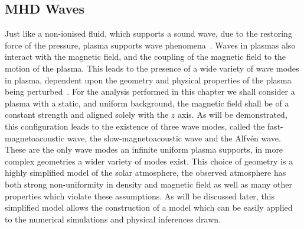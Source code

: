 \subsection{MHD Waves}\label{sec:MHDwaves}
Just like a non-ionised fluid, which supports a sound wave, due to the restoring force of the pressure, plasma supports wave phenomena~\citep{alfven1942}.
Waves in plasmas also interact with the magnetic field, and the coupling of the magnetic field to the motion of the plasma.
This leads to the presence of a wide variety of wave modes in plasma, dependent upon the geometry and physical properties of the plasma being perturbed~\citep{jess2015}.
For the analysis performed in this chapter we shall consider a plasma with a static, and uniform background, the magnetic field shall be of a constant strength and aligned solely with the $z$ axis.
As will be demonstrated, this configuration leads to the existence of three wave modes, called the fast-magnetoacoustic wave, the slow-magnetoacoustic wave and the Alfv\'en wave.
These are the only wave modes an infinite uniform plasma supports, in more complex geometries a wider variety of modes exist.
This choice of geometry is a highly simplified model of the solar atmosphere, the observed atmosphere has both strong non-uniformity in density and magnetic field as well as many other properties which violate these assumptions.
As will be discussed later, this simplified model allows the construction of a model which can be easily applied to the numerical simulations and physical inferences drawn.

